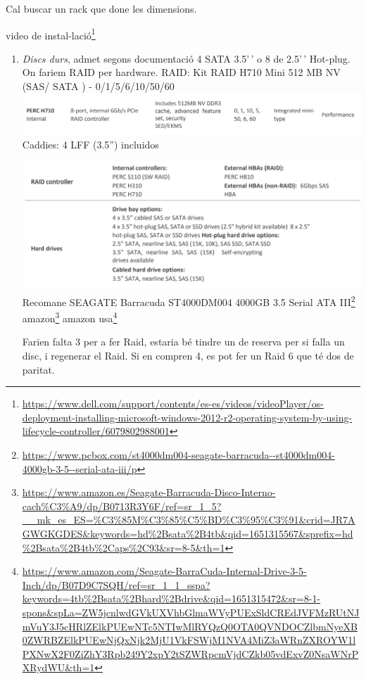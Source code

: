 \documentclass[
  10pt,
]{krantz}
\DeclareRobustCommand{\href}[2]{#2\footnote{\url{#1}}}
\begin{document}
Cal buscar un rack que done les dimensions.

\href{https://www.dell.com/support/contents/es-es/videos/videoPlayer/os-deployment-installing-microsoft-windows-2012-r2-operating-system-by-using-lifecycle-controller/6079802988001}{video de instal-lació}

\begin{enumerate}
\def\labelenumi{\arabic{enumi}.}
\setcounter{enumi}{1}
\item
  \emph{Discs durs}, admet segons documentació 4 SATA 3.5'\,' o 8 de 2.5'\,' Hot-plug. On fariem RAID per hardware. RAID: Kit RAID H710 Mini 512 MB NV (SAS/ SATA ) - 0/1/5/6/10/50/60 \includegraphics{imatges/ser_h710.png} Caddies: 4 LFF (3.5'') incluidos

  \includegraphics{imatges/ser_hd.png} Recomane \href{https://www.pcbox.com/st4000dm004-seagate-barracuda--st4000dm004-4000gb-3-5--serial-ata-iii/p}{SEAGATE Barracuda ST4000DM004 4000GB 3.5 Serial ATA III} \href{https://www.amazon.es/Seagate-Barracuda-Disco-Interno-cach\%C3\%A9/dp/B0713R3Y6F/ref=sr_1_5?__mk_es_ES=\%C3\%85M\%C3\%85\%C5\%BD\%C3\%95\%C3\%91\&crid=JR7AGWGKGDES\&keywords=hd\%2Bsata\%2B4tb\&qid=1651315567\&sprefix=hd\%2Bsata\%2B4tb\%2Caps\%2C93\&sr=8-5\&th=1}{amazon} \href{https://www.amazon.com/Seagate-BarraCuda-Internal-Drive-3-5-Inch/dp/B07D9C7SQH/ref=sr_1_1_sspa?keywords=4tb\%2Bsata\%2Bhard\%2Bdrive\&qid=1651315472\&sr=8-1-spons\&spLa=ZW5jcnlwdGVkUXVhbGlmaWVyPUExSldCREdJVFMzRUtNJmVuY3J5cHRlZElkPUEwNTc5NTIwMlRYQzQ0OTA0QVNDOCZlbmNyeXB0ZWRBZElkPUEwNjQxNjk2MjU1VkFSWjM1NVA4MiZ3aWRnZXROYW1lPXNwX2F0ZiZhY3Rpb249Y2xpY2tSZWRpcmVjdCZkb05vdExvZ0NsaWNrPXRydWU\&th=1}{amazon usa}

  Farien falta 3 per a fer Raid, estaria bé tindre un de reserva per si falla un disc, i regenerar el Raid. Si en compren 4, es pot fer un Raid 6 que té dos de paritat.


\end{enumerate}
\end{document}
